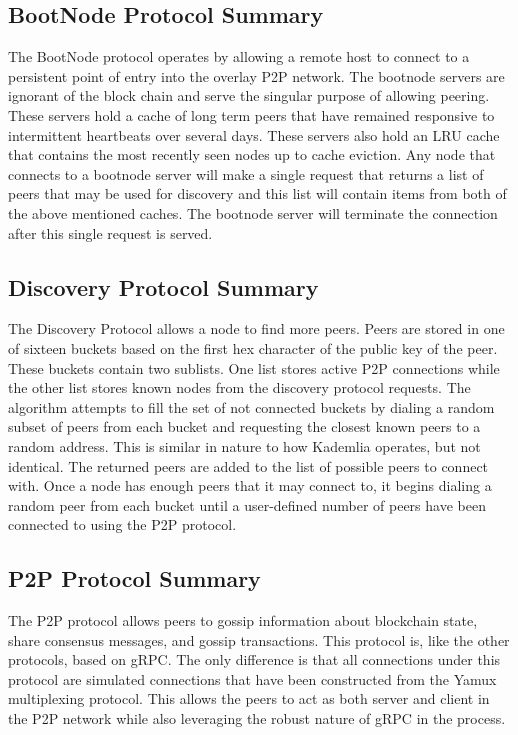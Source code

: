 \subsection{BootNode Protocol Summary}

The BootNode protocol operates by allowing a remote host to connect to
a persistent point of entry into the overlay P2P network.
The bootnode servers are ignorant of the block chain and serve the
singular purpose of allowing peering.
These servers hold a cache of long term peers that have remained
responsive to intermittent heartbeats over several days.
These servers also hold an LRU cache that contains the most recently
seen nodes up to cache eviction.
Any node that connects to a bootnode server will make a single request
that returns a list of peers that may be used for discovery and this
list will contain items from both of the above mentioned caches.
The bootnode server will terminate the connection after this single
request is served.

\subsection{Discovery Protocol Summary}

The Discovery Protocol allows a node to find more peers.
Peers are stored in one of sixteen buckets based on the first hex
character of the public key of the peer.
These buckets contain two sublists.
One list stores active P2P connections while the other list stores
known nodes from the discovery protocol requests.
The algorithm attempts to fill the set of not connected buckets by
dialing a random subset of peers from each bucket and requesting the
closest known peers to a random address.
This is similar in nature to how Kademlia operates, but not identical.
The returned peers are added to the list of possible peers to connect
with.
Once a node has enough peers that it may connect to, it begins dialing
a random peer from each bucket until a user-defined number of peers
have been connected to using the P2P protocol.

\subsection{P2P Protocol Summary}

The P2P protocol allows peers to gossip information about blockchain
state, share consensus messages, and gossip transactions.
This protocol is, like the other protocols, based on gRPC.
The only difference is that all connections under this protocol are
simulated connections that have been constructed from the Yamux
multiplexing protocol.
This allows the peers to act as both server and client in the P2P
network while also leveraging the robust nature of gRPC in the process.
